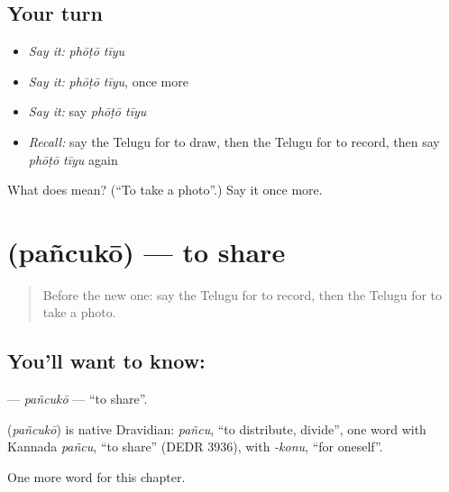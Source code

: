 \subsection*{Your turn}
\begin{itemize}
\raggedright
  \item \emph{Say it:} \emph{phōṭō tīyu}
  \item \emph{Say it:} \emph{phōṭō tīyu}, once more
  \item \emph{Say it:} say \emph{phōṭō tīyu}
  \item \emph{Recall:} say the Telugu for to draw, then the Telugu for to record, then say \emph{phōṭō tīyu} again
\end{itemize}

\begin{tcolorbox}[breakable,colback=teal!4,colframe=teal!35!black,title={Before you move on}]
What does   mean? (\textquotedblleft{}To take a photo\textquotedblright{}.) Say it once more.
\end{tcolorbox}
\section[\texorpdfstring{\te{పంచుకో} (pañcukō)}{పంచుకో (pañcukō)}]{ (pañcukō) — to share}

\label{lesson:TE-C205-pancuko}



\begin{quote}
Before the new one: say the Telugu for to record, then the Telugu for to take a photo.
\end{quote}

\subsection*{You'll want to know: }
\textbf{} — \emph{pañcukō} — \textquotedblleft{}to share\textquotedblright{}.

\begin{cousinweb}
\textbf{} (\emph{pañcukō}) is native Dravidian: \emph{pañcu}, \textquotedblleft{}to distribute, divide\textquotedblright{}, one word with Kannada \emph{pañcu}, \textquotedblleft{}to share\textquotedblright{} (DEDR 3936), with \emph{-konu}, \textquotedblleft{}for oneself\textquotedblright{}.
\end{cousinweb}

\begin{grammarlens}[title={What you've built}]
One more word for this chapter.
\end{grammarlens}

